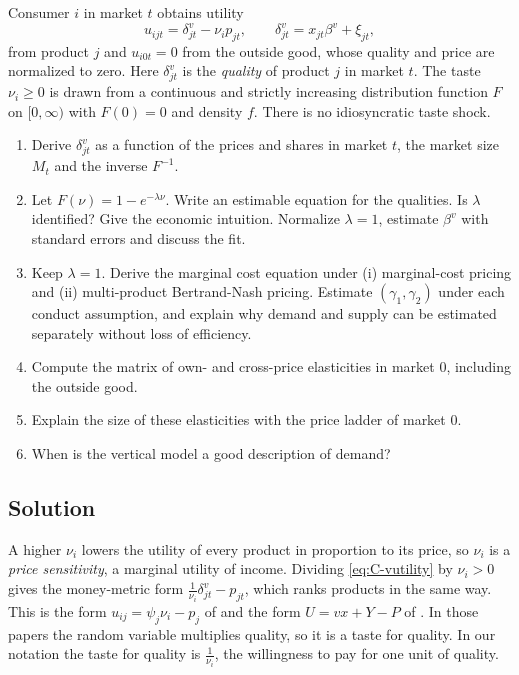 Consumer $i$ in market $t$ obtains utility
\begin{equation}\label{eq:C-vutility}
  u_{ijt} = \delta^v_{jt} - \nu_i p_{jt}, \qquad \delta^v_{jt} = x_{jt}\beta^v + \xi_{jt},
\end{equation}
from product $j$ and $u_{i0t} = 0$ from the outside good, whose quality and price are normalized to zero. Here
$\delta^v_{jt}$ is the \emph{quality} of product $j$ in market $t$. The taste $\nu_i \ge 0$ is drawn from a continuous and
strictly increasing distribution function $F$ on $[0, \infty)$ with $F(0) = 0$ and density $f$. There is no idiosyncratic
taste shock.

\begin{enumerate}[label=(\alph*)]
  \item Derive $\delta^v_{jt}$ as a function of the prices and shares in market $t$, the market size $M_t$ and the
  inverse $F^{-1}$.
  \item Let $F(\nu) = 1 - e^{-\lambda\nu}$. Write an estimable equation for the qualities. Is $\lambda$ identified? Give
  the economic intuition. Normalize $\lambda = 1$, estimate $\beta^v$ with standard errors and discuss the fit.
  \item Keep $\lambda = 1$. Derive the marginal cost equation under (i) marginal-cost pricing and (ii) multi-product
  Bertrand-Nash pricing. Estimate $(\gamma_1, \gamma_2)$ under each conduct assumption, and explain why demand and supply
  can be estimated separately without loss of efficiency.
  \item Compute the matrix of own- and cross-price elasticities in market 0, including the outside good.
  \item Explain the size of these elasticities with the price ladder of market 0.
  \item When is the vertical model a good description of demand?
\end{enumerate}

\subsection{Solution}

\begin{remark}[Interpretation of $\nu_i$]\label{rem:C-nu}
A higher $\nu_i$ lowers the utility of every product in proportion to its price, so $\nu_i$ is a \emph{price
sensitivity}, a marginal utility of income. Dividing \eqref{eq:C-vutility} by $\nu_i > 0$ gives the money-metric form
$\frac{1}{\nu_i}\delta^v_{jt} - p_{jt}$, which ranks products in the same way. This is the form
$u_{ij} = \psi_j\nu_i - p_j$ of \citet[eq.~15, p.~250]{Berry1994} and the form $U = vx + Y - P$ of
\citet[eq.~1, p.~460]{Bresnahan1987}. In those papers the random variable multiplies quality, so it is a taste for
quality. In our notation the taste for quality is $\frac{1}{\nu_i}$, the willingness to pay for one unit of quality.
\end{remark}

